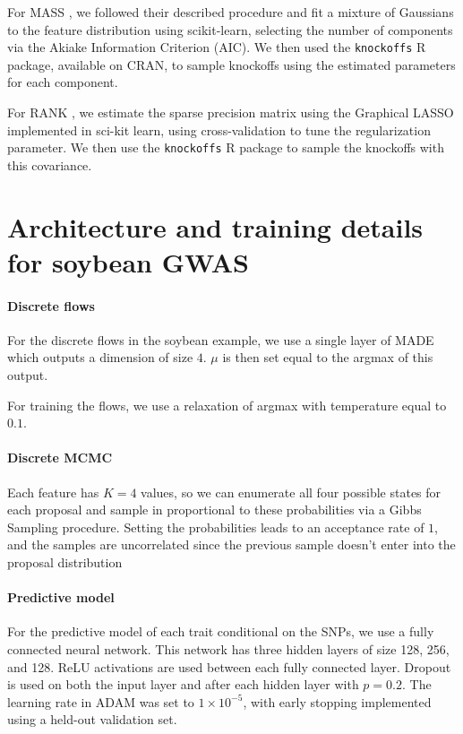 \documentclass{article}
\begin{document}
For MASS \citep{giminezKnockoffsMassNew2019}, we followed their described procedure and fit a mixture of Gaussians to the feature distribution using scikit-learn, selecting the number of components via the Akiake Information Criterion (AIC).
We then used the \texttt{knockoffs} R package, available on CRAN, to sample knockoffs using the estimated parameters for each component.

For RANK \citep{fanRANKLargeScaleInference2020}, we estimate the sparse precision matrix using the Graphical LASSO \citep{friedmanSparseInverseCovariance2008} implemented in sci-kit learn, using cross-validation to tune the regularization parameter. We then use the \texttt{knockoffs} R package to sample the knockoffs with this covariance.

\section{Architecture and training details for soybean GWAS} \label{sec:soybean_training}

\paragraph{Discrete flows}

For the discrete flows in the soybean example, we use a single layer of MADE which outputs a dimension of size $4$. $\mu$ is then set equal to the argmax of this output.

For training the flows, we use a relaxation of argmax with temperature equal to $0.1$.

\paragraph{Discrete MCMC}

Each feature has $K=4$ values, so we can enumerate all four possible states for each proposal and sample in proportional to these probabilities via a Gibbs Sampling procedure.
Setting the probabilities leads to an acceptance rate of $1$, and the samples are uncorrelated since the previous sample doesn't enter into the proposal distribution

\paragraph{Predictive model}
For the predictive model of each trait conditional on the SNPs, we use a fully connected neural network.
This network has three hidden layers of size 128, 256, and 128.
ReLU activations are used between each fully connected layer.
Dropout is used on both the input layer and after each hidden layer with $p=0.2$.
The learning rate in ADAM was set to $1 \times 10^{-5}$, with early stopping implemented using a held-out validation set.
\end{document}
